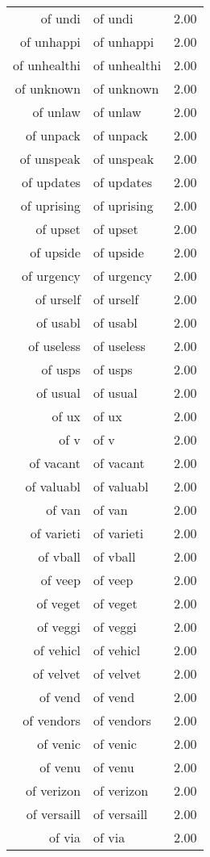 \begin{table}[ht]
\begin{tabular}{rlr}
  of undi & of undi & 2.00 \\ 
  of unhappi & of unhappi & 2.00 \\ 
  of unhealthi & of unhealthi & 2.00 \\ 
  of unknown & of unknown & 2.00 \\ 
  of unlaw & of unlaw & 2.00 \\ 
  of unpack & of unpack & 2.00 \\ 
  of unspeak & of unspeak & 2.00 \\ 
  of updates & of updates & 2.00 \\ 
  of uprising & of uprising & 2.00 \\ 
  of upset & of upset & 2.00 \\ 
  of upside & of upside & 2.00 \\ 
  of urgency & of urgency & 2.00 \\ 
  of urself & of urself & 2.00 \\ 
  of usabl & of usabl & 2.00 \\ 
  of useless & of useless & 2.00 \\ 
  of usps & of usps & 2.00 \\ 
  of usual & of usual & 2.00 \\ 
  of ux & of ux & 2.00 \\ 
  of v & of v & 2.00 \\ 
  of vacant & of vacant & 2.00 \\ 
  of valuabl & of valuabl & 2.00 \\ 
  of van & of van & 2.00 \\ 
  of varieti & of varieti & 2.00 \\ 
  of vball & of vball & 2.00 \\ 
  of veep & of veep & 2.00 \\ 
  of veget & of veget & 2.00 \\ 
  of veggi & of veggi & 2.00 \\ 
  of vehicl & of vehicl & 2.00 \\ 
  of velvet & of velvet & 2.00 \\ 
  of vend & of vend & 2.00 \\ 
  of vendors & of vendors & 2.00 \\ 
  of venic & of venic & 2.00 \\ 
  of venu & of venu & 2.00 \\ 
  of verizon & of verizon & 2.00 \\ 
  of versaill & of versaill & 2.00 \\ 
  of via & of via & 2.00 \\ 

\end{tabular}
\end{table}
